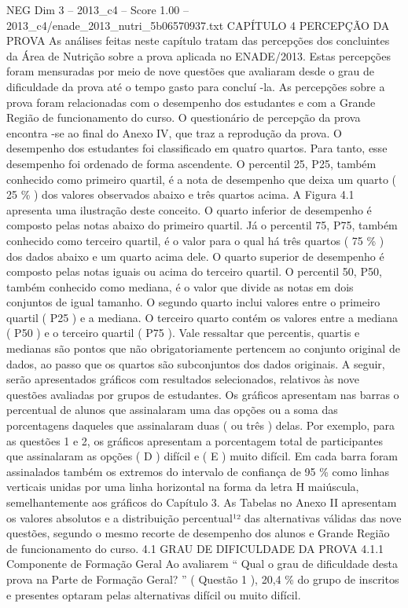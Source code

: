 \begin{textsample}{NEG Dim 3 – 2013\_c4 – Score 1.00 – 2013\_c4/enade\_2013\_nutri\_5b06570937.txt}  \label{ex:f3_neg_138}
CAPÍTULO 4 PERCEPÇÃO DA PROVA As análises feitas neste capítulo tratam das percepções dos concluintes da Área de Nutrição sobre a prova aplicada no ENADE/2013.
Estas percepções foram mensuradas por meio de nove questões que avaliaram desde o grau de dificuldade da prova até o tempo gasto para concluí -la.
As percepções sobre a prova foram relacionadas com o desempenho dos estudantes e com a Grande Região de funcionamento do curso.
O questionário de percepção da prova encontra -se ao final do Anexo IV, que traz a reprodução da prova.
O desempenho dos estudantes foi classificado em quatro quartos.
Para tanto, esse desempenho foi ordenado de forma ascendente.
O percentil 25, P25, também conhecido como primeiro quartil, é a nota de desempenho que deixa um quarto ( 25 \% ) dos valores observados abaixo e três quartos acima.
A Figura 4.1 apresenta uma ilustração deste conceito.
O quarto inferior de desempenho é composto pelas notas abaixo do primeiro quartil.
Já o percentil 75, P75, também conhecido como terceiro quartil, é o valor para o qual há três quartos ( 75 \% ) dos dados abaixo e um quarto acima dele.
O quarto superior de desempenho é composto pelas notas iguais ou acima do terceiro quartil.
O percentil 50, P50, também conhecido como mediana, é o valor que divide as notas em dois conjuntos de igual tamanho.
O segundo quarto inclui valores entre o primeiro quartil ( P25 ) e a mediana.
O terceiro quarto contém os valores entre a mediana ( P50 ) e o terceiro quartil ( P75 ).
Vale ressaltar que percentis, quartis e medianas são pontos que não obrigatoriamente pertencem ao conjunto original de dados, ao passo que os quartos são subconjuntos dos dados originais.
A seguir, serão apresentados gráficos com resultados selecionados, relativos às nove questões avaliadas por grupos de estudantes.
Os gráficos apresentam nas barras o percentual de alunos que assinalaram uma das opções ou a soma das porcentagens daqueles que assinalaram duas ( ou três ) delas.
Por exemplo, para as questões 1 e 2, os gráficos apresentam a porcentagem total de participantes que assinalaram as opções ( D ) difícil e ( E ) muito difícil.
Em cada barra foram assinalados também os extremos do intervalo de confiança de 95 \% como linhas verticais unidas por uma linha horizontal na forma da letra H maiúscula, semelhantemente aos gráficos do Capítulo 3.
As Tabelas no Anexo II apresentam os valores absolutos e a distribuição percentual¹² das alternativas válidas das nove questões, segundo o mesmo recorte de desempenho dos alunos e Grande Região de funcionamento do curso. 4.1 GRAU DE DIFICULDADE DA PROVA 4.1.1 Componente de Formação Geral Ao avaliarem “ Qual o grau de dificuldade desta prova na Parte de Formação Geral? ” ( Questão 1 ), 20,4 \% do grupo de inscritos e presentes optaram pelas alternativas difícil ou muito difícil.

\end{textsample}

